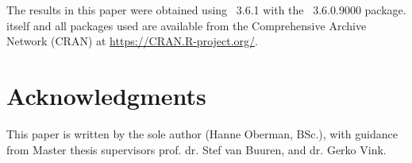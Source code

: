 \documentclass[article]{jss}
\begin{document}
The results in this paper were obtained using ~3.6.1 with the ~3.6.0.9000 package.  itself and all packages used are available from the Comprehensive  Archive Network (CRAN) at \url{https://CRAN.R-project.org/}.


\section*{Acknowledgments}

This paper is written by the sole author (Hanne Oberman, BSc.), with guidance from Master thesis supervisors prof. dr. Stef van Buuren, and dr. Gerko Vink.






\newpage

\begin{appendix}

\end{appendix}

\end{document}
